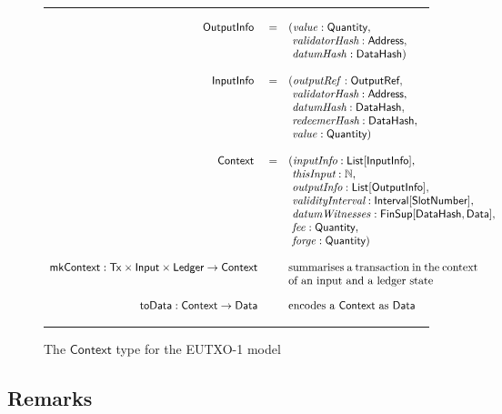 \documentclass[a4paper]{article}
\renewcommand{\i}{\textit}  %
\newcommand{\s}{\textsf}  %
\newcommand{\msf}[1]{\ensuremath{\mathsf{#1}}}
\newcommand{\mi}[1]{\ensuremath{\mathit{#1}}}
\newcommand\rfskip{7pt}
\newenvironment{ruledfigure}[1]{\begin{figure}[#1]\hrule\vspace{\rfskip}}{\vspace{\rfskip}\hrule\end{figure}}
\newcommand{\List}[1]{\ensuremath{\s{List}[#1]}}
\newcommand{\Interval}[1]{\ensuremath{\s{Interval}[#1]}}
\newcommand{\FinSup}[2]{\ensuremath{\s{FinSup}[#1,#2]}}
\newcommand{\ctx}{\ensuremath{\s{Context}}}
\newcommand{\toData}{\ensuremath{\s{toData}}}
\newcommand{\mkContext}{\ensuremath{\s{mkContext}}}
\newcommand{\Address}{\ensuremath{\s{Address}}}
\newcommand{\DataHash}{\ensuremath{\s{DataHash}}}
\newcommand{\forge}{\mi{forge}}
\newcommand{\fee}{\mi{fee}}
\newcommand{\val}{\mi{value}}  %
\newcommand{\datumHash}{\mi{datumHash}}
\newcommand{\datumWits}{\mi{datumWitnesses}}
\newcommand{\Data}{\ensuremath{\s{Data}}}
\newcommand{\outputref}{\mi{outputRef}}
\newcommand{\slotnum}{\ensuremath{\s{SlotNumber}}}
\newcommand{\eutxotx}{\msf{Tx}}
\newcommand{\qty}{\ensuremath{\s{Quantity}}}
\newcommand\N{\ensuremath{\mathbb{N}}}
\begin{document}
\begin{ruledfigure}{H}
  \begin{displaymath}
  \begin{array}{rll}
    \s{OutputInfo } &=&(\val: \qty,\\
                    & &\ \i{validatorHash}: \Address,\\
                    & &\ \datumHash: \DataHash)\\
    \\
    \s{InputInfo } &=&(\outputref: \s{OutputRef},\\
                   & &\ \i{validatorHash}: \Address,\\
                   & &\ \i{datumHash}: \DataHash,\\
                   & &\ \i{redeemerHash}: \DataHash,\\
                   & &\ \val: \qty)\\
     \\
     \ctx\s{ } &=&(\i{inputInfo}: \List{\s{InputInfo}},\\
               & &\ \i{thisInput}: \N,\\
               & &\ \i{outputInfo}: \List{\s{OutputInfo}},\\
               & &\ \i{validityInterval}: \Interval{\slotnum},\\
               & &\ \datumWits: \FinSup{\DataHash}{\Data},\\
               & &\ \fee: \qty,\\
               & &\ \forge: \qty)\\
     \\
     \mkContext: \eutxotx \times \s{Input} \times \s{Ledger} \rightarrow \ctx
      && \mbox{\parbox[t]{6cm}{summarises a transaction in the context of an input and a ledger state}}\\
      \\
     \toData: \ctx \rightarrow \Data & & \mbox{encodes a \ctx{} as \Data}
  \end{array}
  \end{displaymath}
  \caption{The \ctx{} type for the EUTXO-1 model}
  \label{fig:ptx-1-types}
\end{ruledfigure}

\subsection{Remarks}
\end{document}
